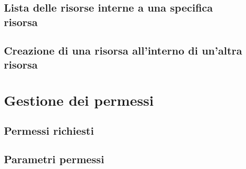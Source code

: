 \subsection{Lista delle risorse interne a una specifica risorsa} \label{api:lista-risorsa}

\subsection{Creazione di una risorsa all'interno di un'altra risorsa} \label{api:creazione-risorsa}

\section{Gestione dei permessi}

\subsection{Permessi richiesti} \label{api:permessi-richiesti}

\subsection{Parametri permessi} \label{api:parametri-permessi}
